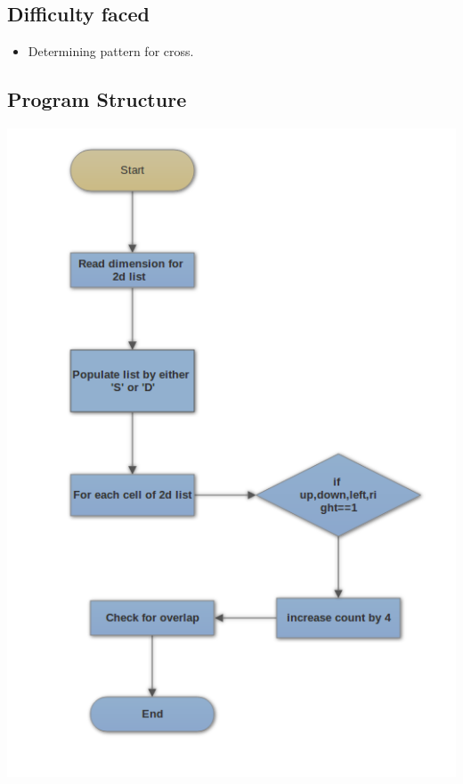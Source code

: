 \documentclass[11pt]{article}
\begin{document}
{{}

\subsection{Difficulty faced}
{
\begin{itemize}
\item Determining pattern for cross.
\end{itemize}
}

\subsection{Program Structure}
\begin{center}
\includegraphics[scale=0.60]{fc1.png}
\end{center}
\newpage


}
\end{document}

